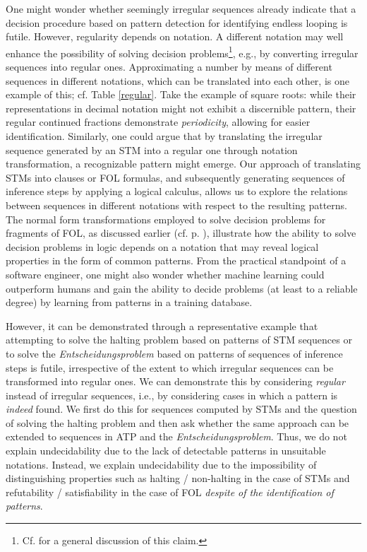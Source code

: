 \documentclass[%
  manuscript=article,   %
  year=2024,
  volume=77,
  doi=00000.000,
]{zfn}
\begin{document}
One might wonder whether seemingly irregular sequences already indicate that a decision procedure based on pattern detection for identifying endless looping is futile. However, regularity depends on notation.
A different notation may well enhance the possibility of solving decision problems\footnote{Cf. \parencite{Lampert2} for a general discussion of this claim.}, e.g., by converting irregular sequences into regular ones.
Approximating a number by means of different sequences in different notations, which can be translated into each other, is one example of this; cf. Table \ref{regular}. Take the example of square roots: while their representations in decimal notation might not exhibit a discernible pattern, their regular continued fractions demonstrate \emph{periodicity}, allowing for easier identification.
Similarly, one could argue that by translating the irregular sequence generated by an STM into a regular one through notation transformation, a recognizable pattern might emerge. Our approach of translating STMs into clauses or FOL formulas, and subsequently generating sequences of inference steps by applying a logical calculus, allows us to explore the relations between sequences in different notations with respect to the resulting patterns.
The normal form transformations employed to solve decision problems for fragments of FOL, as discussed earlier (cf. p. \pageref{normalforms}), illustrate how the ability to solve decision problems in logic depends on a notation that may reveal logical properties in the form of common patterns. From the practical standpoint of a software engineer, one might also wonder whether machine learning could outperform humans and gain the ability to decide problems (at least to a reliable degree) by learning from patterns in a training database.

However, it can be demonstrated through a representative example that attempting to solve the halting problem based on patterns of STM sequences or to solve the \emph{Entscheidungsproblem} based on patterns of sequences of inference steps is futile, irrespective of the extent to which irregular sequences can be transformed into regular ones.
We can demonstrate this by considering \emph{regular} instead of irregular sequences, i.e., by considering cases in which a pattern is \textit{indeed} found. We first do this for sequences computed by STMs and the question of solving the halting problem and then ask whether the same approach can be extended to sequences in ATP and the \emph{Entscheidungsproblem}. Thus, we do not explain undecidability due to the lack of detectable patterns in unsuitable notations. Instead, we explain undecidability due to the impossibility of distinguishing properties such as halting / non-halting in the case of STMs and refutability / satisfiability in the case of FOL \emph{despite of the identification of patterns}. 
\end{document}

